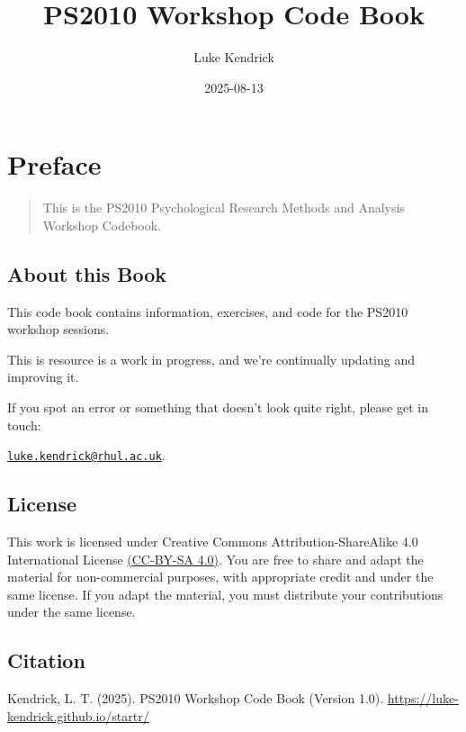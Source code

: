 \documentclass[
]{book}
\title{PS2010 Workshop Code Book}
\author{Luke Kendrick}
\date{2025-08-13}
\let\oldsection\section
\renewcommand{\section}{\needspace{5\baselineskip}\oldsection}
\begin{document}
\maketitle

{
\setcounter{tocdepth}{1}
\tableofcontents
}
\chapter*{Preface}\label{preface}

\begin{quote}
This is the PS2010 Psychological Research Methods and Analysis Workshop Codebook.
\end{quote}

\section{About this Book}\label{about-this-book}

This code book contains information, exercises, and code for the PS2010 workshop sessions.

This is resource is a work in progress, and we're continually updating and improving it.

If you spot an error or something that doesn't look quite right, please get in touch:

\href{mailto:luke.kendrick@rhul.ac.uk}{\nolinkurl{luke.kendrick@rhul.ac.uk}}.

\section{\texorpdfstring{\textbf{License}}{License}}\label{license}

This work is licensed under Creative Commons Attribution-ShareAlike 4.0 International License \href{https://creativecommons.org/licenses/by-sa/4.0/}{(CC-BY-SA 4.0)}. You are free to share and adapt the material for non-commercial purposes, with appropriate credit and under the same license. If you adapt the material, you must distribute your contributions under the same license.

\section{\texorpdfstring{\textbf{Citation}}{Citation}}\label{citation}

Kendrick, L. T. (2025). PS2010 Workshop Code Book (Version 1.0). \url{https://luke-kendrick.github.io/startr/}
\end{document}
